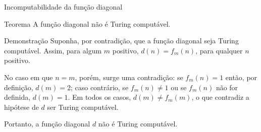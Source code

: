 \begin{frame}[fragile]{Incomputabilidade da função diagonal}

    \begin{block}{Teorema}
        A função diagonal não é Turing computável.
    \end{block}

    \begin{block}{Demonstração}
        Suponha, por contradição, que a função diagonal seja Turing computável. Assim, para algum
        $m$ positivo, $d(n) = f_m(n)$, para qualquer $n$ positivo. 

        \vspace{0.1in}

        No caso em que $n = m$, porém, surge uma contradição: se $f_m(n) = 1$ então, por definição,
        $d(m) = 2$; caso contrário, se $f_m(n)\neq 1$ ou se $f_m(n)$ não for definida, $d(m) = 1$.
        Em todos os casos, $d(m) \neq f_m(m)$, o que contradiz a hipótese de $d$ ser Turing
        computável.
     
        \vspace{0.1in}

        Portanto, a função diagonal $d$ não é Turing computável.
    \end{block}

\end{frame}

